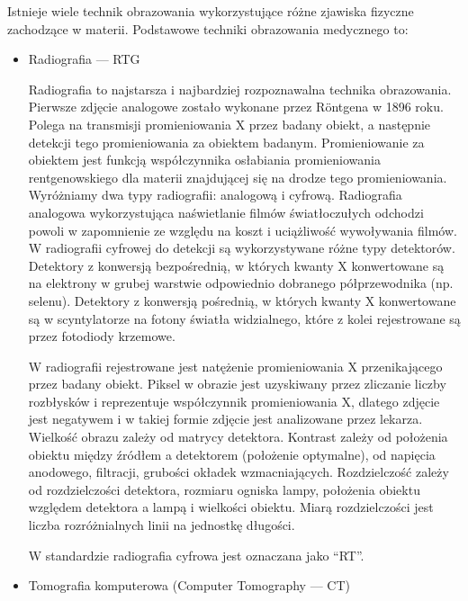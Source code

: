 Istnieje wiele technik obrazowania wykorzystujące różne zjawiska fizyczne zachodzące w materii.
Podstawowe techniki obrazowania medycznego to:
\label{sec:basic-imaging-technics}
\begin{itemize}
    \item Radiografia --- RTG

          Radiografia to najstarsza i najbardziej rozpoznawalna technika obrazowania.
          Pierwsze zdjęcie analogowe zostało wykonane przez Röntgena w 1896 roku.
          Polega na transmisji promieniowania X przez badany obiekt, a następnie detekcji tego promieniowania za obiektem badanym.
          Promieniowanie za obiektem jest funkcją współczynnika osłabiania promieniowania rentgenowskiego dla materii znajdującej się na drodze tego promieniowania.
          Wyróżniamy dwa typy radiografii: analogową i cyfrową.
          Radiografia analogowa wykorzystująca naświetlanie filmów światłoczułych odchodzi powoli w zapomnienie ze względu na koszt i uciążliwość wywoływania filmów.
          W radiografii cyfrowej do detekcji są wykorzystywane różne typy detektorów.
          Detektory z konwersją bezpośrednią, w których kwanty X konwertowane są na elektrony w grubej warstwie odpowiednio dobranego półprzewodnika (np. selenu).
          Detektory z konwersją pośrednią, w których kwanty X konwertowane są w scyntylatorze na fotony światła widzialnego, które z kolei rejestrowane są przez fotodiody krzemowe.

          W radiografii rejestrowane jest natężenie promieniowania X przenikającego przez badany obiekt.
          Piksel w obrazie jest uzyskiwany przez zliczanie liczby rozbłysków i reprezentuje współczynnik promieniowania X, dlatego zdjęcie jest negatywem i w takiej formie zdjęcie jest analizowane przez lekarza.
          Wielkość obrazu zależy od matrycy detektora.
          Kontrast zależy od położenia obiektu między źródłem a detektorem (położenie optymalne), od napięcia anodowego, filtracji, grubości okładek wzmacniających.
          Rozdzielczość zależy od rozdzielczości detektora, rozmiaru ogniska lampy, położenia obiektu względem detektora a lampą i wielkości obiektu.
          Miarą rozdzielczości jest liczba rozróżnialnych linii na jednostkę długości.

          W standardzie \DICOM radiografia cyfrowa jest oznaczana jako \enquote{RT}.

    \item Tomografia komputerowa (Computer Tomography --- CT)


\end{itemize}
